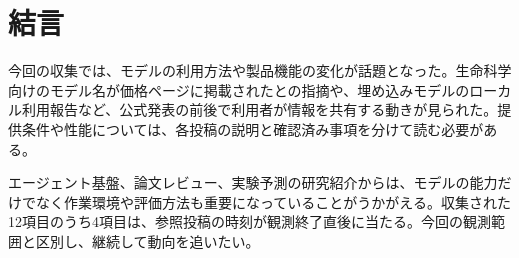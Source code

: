 \section*{結言}
今回の収集では、モデルの利用方法や製品機能の変化が話題となった。生命科学向けのモデル名が価格ページに掲載されたとの指摘や、埋め込みモデルのローカル利用報告など、公式発表の前後で利用者が情報を共有する動きが見られた。提供条件や性能については、各投稿の説明と確認済み事項を分けて読む必要がある。

エージェント基盤、論文レビュー、実験予測の研究紹介からは、モデルの能力だけでなく作業環境や評価方法も重要になっていることがうかがえる。収集された12項目のうち4項目は、参照投稿の時刻が観測終了直後に当たる。今回の観測範囲と区別し、継続して動向を追いたい。
